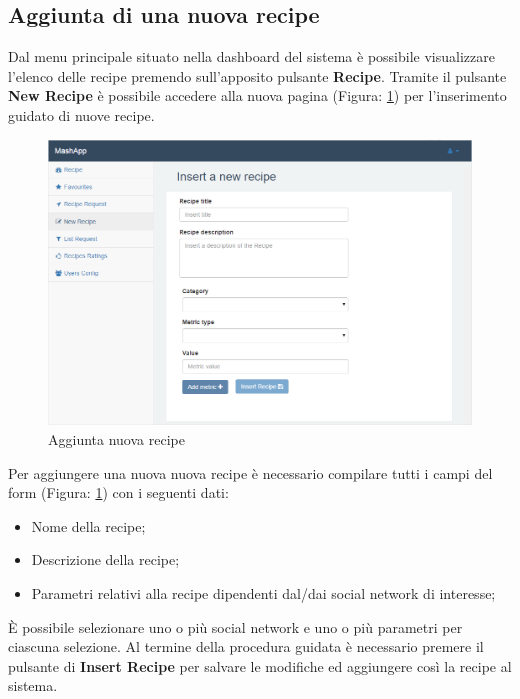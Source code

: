 	\subsection{Aggiunta di una nuova recipe}
		Dal menu principale situato nella dashboard\gloss{} del sistema è possibile visualizzare l'elenco delle recipe\gloss{} premendo sull'apposito pulsante \textbf{Recipe}.\newline
		Tramite il pulsante \textbf{New Recipe} è possibile accedere alla nuova pagina (Figura: \ref{fig:aggiunta_nuova_recipe}) per l'inserimento guidato di nuove recipe\gloss{}.
		\begin{figure}[H]
			\centering
			\centerline{\includegraphics[width=14cm]{images/nuova_ricetta.png}}
			\caption{Aggiunta nuova recipe}
			\label{fig:aggiunta_nuova_recipe}
		\end{figure}
		Per aggiungere una nuova nuova recipe\gloss{} è necessario compilare tutti i campi del form\gloss{} (Figura: \ref{fig:aggiunta_nuova_recipe}) con i seguenti dati:
		\begin{itemize}
			\item Nome della recipe;
			\item Descrizione della recipe;
			\item Parametri relativi alla recipe dipendenti dal/dai social network di interesse;
		\end{itemize}
		È possibile selezionare uno o più social network e uno o più parametri per ciascuna selezione.\newline
		Al termine della procedura guidata è necessario premere il pulsante di \textbf{Insert Recipe} per salvare le modifiche ed aggiungere così la recipe\gloss{} al sistema.


